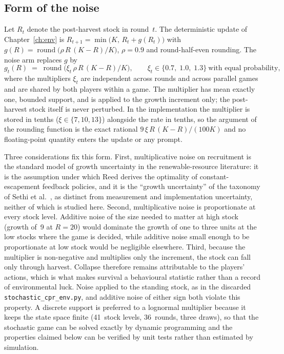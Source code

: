 \subsection{Form of the noise}

Let \(R_t\) denote the post-harvest stock in round~\(t\).
The deterministic update of Chapter~\ref{ch:env} is
\(R_{t+1} = \min\bigl(K,\, R_t + g(R_t)\bigr)\) with
\(g(R) = \operatorname{round}\bigl(\rho\, R\,(K-R)/K\bigr)\), \(\rho = 0.9\)
and round-half-even rounding.
The noise arm replaces \(g\) by
\begin{equation}
  g_t(R) \;=\; \operatorname{round}\!\bigl(\xi_t\,\rho\, R\,(K-R)/K\bigr),
  \qquad
  \xi_t \in \{0.7,\;1.0,\;1.3\}\ \text{with equal probability},
  \label{eq:noise-update}
\end{equation}
where the multipliers \(\xi_t\) are independent across rounds and across
parallel games and are shared by both players within a game.
The multiplier has mean exactly one, bounded support, and is applied to the
growth increment only; the post-harvest stock itself is never perturbed.
In the implementation the multiplier is stored in tenths
(\(\xi \in \{7, 10, 13\}\)) alongside the rate in tenths, so the argument of
the rounding function is the exact rational
\(9\,\xi\,R\,(K-R)/(100K)\) and no floating-point quantity enters the update
or any prompt.

Three considerations fix this form.
First, multiplicative noise on recruitment is the standard model of growth
uncertainty in the renewable-resource literature: it is the assumption under
which Reed \cite{reed1979} derives the optimality of constant-escapement
feedback policies, and it is the ``growth uncertainty'' of the taxonomy of
Sethi et al.\ \cite{sethi2005}, as distinct from measurement and
implementation uncertainty, neither of which is studied here.
Second, multiplicative noise is proportionate at every stock level.
Additive noise of the size needed to matter at high stock (growth of~9
at \(R=20\)) would dominate the growth of one to three units at the low
stocks where the game is decided, while additive noise small enough to be
proportionate at low stock would be negligible elsewhere.
Third, because the multiplier is non-negative and multiplies only the
increment, the stock can fall only through harvest.
Collapse therefore remains attributable to the players' actions, which is
what makes survival a behavioural statistic rather than a record of
environmental luck.
Noise applied to the standing stock, as in the discarded
\texttt{stochastic\_cpr\_env.py}, and additive noise of either sign both
violate this property.
A discrete support is preferred to a lognormal multiplier because it keeps
the state space finite (41~stock levels, 36~rounds, three draws), so that
the stochastic game can be solved exactly by dynamic programming and the
properties claimed below can be verified by unit tests rather than
estimated by simulation.

